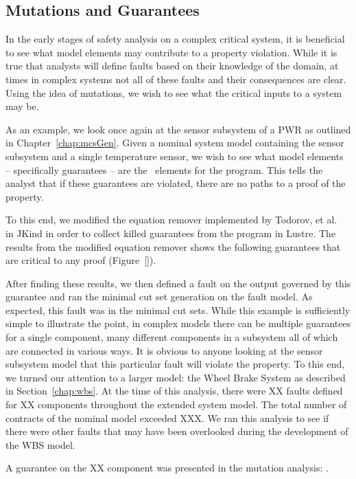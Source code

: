 \subsection{Mutations and Guarantees}
\label{sec:granularityMutationInputs}
In the early stages of safety analysis on a complex critical system, it is beneficial to see what model elements may contribute to a property violation. While it is true that analysts will define faults based on their knowledge of the domain, at times in complex systems not all of these faults and their consequences are clear. Using the idea of mutations, we wish to see what the critical inputs to a system may be. 

As an example, we look once again at the sensor subsystem of a PWR as outlined in Chapter~\ref{chap:mcsGen}. Given a nominal system model containing the sensor subsystem and a single temperature sensor, we wish to see what model elements -- specifically guarantees -- are the \mustcov\  elements for the program. This tells the analyst that if these guarantees are violated, there are no paths to a proof of the property. 

To this end, we modified the equation remover implemented by Todorov, et al.~\cite{NFM2020Todorov} in JKind in order to collect killed guarantees from the program in Lustre. The results from the modified equation remover shows the following guarantees that are critical to any proof (Figure~\ref{}). 

After finding these results, we then defined a fault on the output governed by this guarantee and ran the minimal cut set generation on the fault model. As expected, this fault was in the minimal cut sets. While this example is sufficiently simple to illustrate the point, in complex models there can be multiple guarantees for a single component, many different components in a subsystem all of which are connected in various ways. It is obvious to anyone looking at the sensor subsystem model that this particular fault will violate the property. To this end, we turned our attention to a larger model: the Wheel Brake System as described in Section~\ref{chap:wbs}. At the time of this analysis, there were XX faults defined for XX components throughout the extended system model. The total number of contracts of the nominal model exceeded XXX. We ran this analysis to see if there were other faults that may have been overlooked during the development of the WBS model. 

A guarantee on the XX component was presented in the mutation analysis: . 


